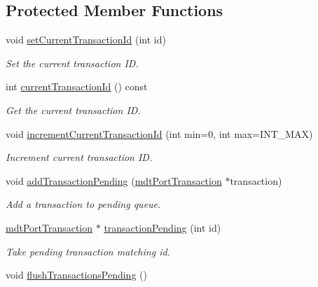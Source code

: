 \subsection*{Protected Member Functions}
\begin{DoxyCompactItemize}
\item 
\hypertarget{classmdt_port_manager_a3f1d25b2441c467c0de9908c73422a93}{
void \hyperlink{classmdt_port_manager_a3f1d25b2441c467c0de9908c73422a93}{setCurrentTransactionId} (int id)}
\label{classmdt_port_manager_a3f1d25b2441c467c0de9908c73422a93}

\begin{DoxyCompactList}\small\item\em Set the current transaction ID. \end{DoxyCompactList}\item 
\hypertarget{classmdt_port_manager_a19abf29c8948cde0337d67c9722c25aa}{
int \hyperlink{classmdt_port_manager_a19abf29c8948cde0337d67c9722c25aa}{currentTransactionId} () const }
\label{classmdt_port_manager_a19abf29c8948cde0337d67c9722c25aa}

\begin{DoxyCompactList}\small\item\em Get the current transaction ID. \end{DoxyCompactList}\item 
\hypertarget{classmdt_port_manager_a4d009936a0a5130f3bfecb69fee4ce42}{
void \hyperlink{classmdt_port_manager_a4d009936a0a5130f3bfecb69fee4ce42}{incrementCurrentTransactionId} (int min=0, int max=INT\_\-MAX)}
\label{classmdt_port_manager_a4d009936a0a5130f3bfecb69fee4ce42}

\begin{DoxyCompactList}\small\item\em Increment current transaction ID. \end{DoxyCompactList}\item 
void \hyperlink{classmdt_port_manager_ac58ed84e0e9230d1931557bc4bbe8a50}{addTransactionPending} (\hyperlink{classmdt_port_transaction}{mdtPortTransaction} $\ast$transaction)
\begin{DoxyCompactList}\small\item\em Add a transaction to pending queue. \end{DoxyCompactList}\item 
\hyperlink{classmdt_port_transaction}{mdtPortTransaction} $\ast$ \hyperlink{classmdt_port_manager_a18478707a9be7638b06cde48ced48297}{transactionPending} (int id)
\begin{DoxyCompactList}\small\item\em Take pending transaction matching id. \end{DoxyCompactList}\item 
\hypertarget{classmdt_port_manager_a85b87522eb9ec9b80ff24e3ad2ef4a00}{
void \hyperlink{classmdt_port_manager_a85b87522eb9ec9b80ff24e3ad2ef4a00}{flushTransactionsPending} ()}
\label{classmdt_port_manager_a85b87522eb9ec9b80ff24e3ad2ef4a00}


\end{DoxyCompactItemize}
